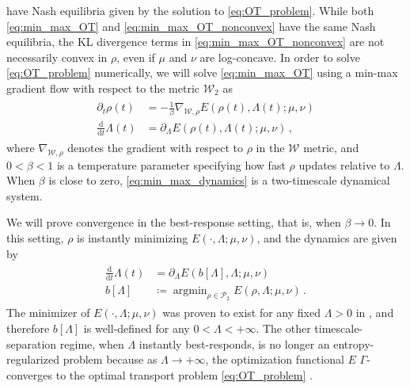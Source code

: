 \documentclass[11pt,a4paper,final]{article}
\def\W{\mathcal W}
\def\P{\mathcal P}
\newcommand{\Wass}{\mathscr{W}}
\DeclareMathOperator*{\amin}{argmin}
\renewcommand{\d}{\mathrm{d}}
\newcommand{\ddt}{\frac{\d}{\d t}}
\newcommand{\1}{\mathbf{1}}
\theoremstyle{plain}
\numberwithin{equation}{section}
\numberwithin{theorem}{section}
\begin{document}
have Nash equilibria given by the solution to \eqref{eq:OT_problem}.
While both \eqref{eq:min_max_OT} and \eqref{eq:min_max_OT_nonconvex} have the same Nash equilibria, the KL divergence terms in \eqref{eq:min_max_OT_nonconvex} are not necessarily convex in $\rho$, even if $\mu$ and $\nu$ are log-concave.
In order to solve \eqref{eq:OT_problem} numerically, we will solve \eqref{eq:min_max_OT} using a min-max gradient flow with respect to the metric $\W_2$ as
\begin{align}\label{eq:min_max_dynamics}
\begin{split}
        \partial_t \rho(t) &= -\frac{1}{\beta}\nabla_{\Wass,\rho} E(\rho(t),\Lambda(t);\mu,\nu) \\
    \ddt \Lambda(t) &= \partial_\Lambda  E(\rho(t),\Lambda(t);\mu,\nu)\,,
\end{split}
\end{align}
where $\nabla_{\Wass,\rho}$ denotes the gradient with respect to $\rho$ in the $\Wass$ metric, and  $0<\beta<1$ is a temperature parameter specifying how fast $\rho$ updates relative to $\Lambda$. When $\beta$ is close to zero, \eqref{eq:min_max_dynamics} is a two-timescale dynamical system.


We will prove convergence in the best-response setting, that is, when $\beta \rightarrow 0$. In this setting, $\rho$ is instantly minimizing $E(\cdot,\Lambda;\mu,\nu)$, and the dynamics are given by
\begin{align}\label{eq:best_response_dynamics}
\begin{split}
        \ddt \Lambda(t) &= \partial_\Lambda  E(b[\Lambda],\Lambda;\mu,\nu) \\
    b[\Lambda] &\coloneqq \amin_{\rho\in\P_2} E(\rho,\Lambda;\mu,\nu) \,.
\end{split}
\end{align}
The minimizer of $E(\cdot,\Lambda;\mu,\nu)$ was proven to exist for any fixed $\Lambda>0$ in \cite[Corollary 1]{liu_approximating_2021}, and therefore $b[\Lambda]$ is well-defined for any $0<\Lambda<+\infty$. 
The other timescale-separation regime, when $\Lambda$ instantly best-responds, is no longer an entropy-regularized problem because as $\Lambda \rightarrow +\infty$, the optimization functional $E$ $\Gamma$-converges to the optimal transport problem \eqref{eq:OT_problem} \cite[Theorem 7]{liu_approximating_2021}. 
\end{document}
